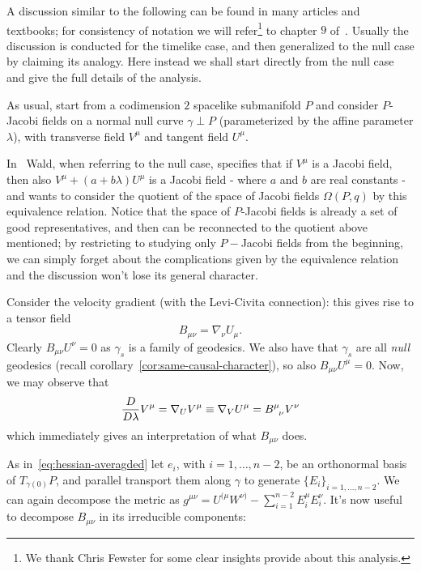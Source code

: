 A discussion similar to the following can be found in many articles and textbooks; for consistency of notation we will refer\footnote{We thank Chris Fewster for some clear insights provide about this analysis.} to chapter \(9\) of~\cite{wald2010general}.
Usually the discussion is conducted for the timelike case, and then generalized to the null case by claiming its analogy. Here instead we shall start directly from the null case and give the full details of the analysis.
	
As usual, start from a codimension \(2\) spacelike submanifold \(P\) and consider \(P\)-Jacobi fields on a normal null curve \(\gamma \perp P\) (parameterized by the affine parameter \(\lambda\)), with transverse field \(V^{\mu}\) and tangent field \(U^{\mu}\).
\begin{remark}
	In~\cite{wald2010general} Wald, when referring to the null case, specifies that if \(V^{\mu}\) is a Jacobi field, then also \(V^{\mu} + (a + b\lambda) U^{\mu}\) is a Jacobi field - where \(a\) and \(b\) are real constants - and wants to consider the quotient of the space of Jacobi fields \(\Omega (P,q)\) by this equivalence relation. Notice that the space of \(P\)-Jacobi fields is already a set of good representatives, and then can be reconnected to the quotient above mentioned; by restricting to studying only \(P-\)Jacobi fields from the beginning, we can simply forget about the complications given by the equivalence relation and the discussion won't lose its general character.
\end{remark}

Consider the velocity gradient (with the Levi-Civita connection): this gives rise to a tensor field
\[
B_{\mu\nu} = \nabla_{\nu}U_{\mu}.
\]
Clearly \(B_{\mu\nu}U^{\nu} = 0\) as \(\gamma_s\) is a family of geodesics. We also have that \(\gamma_s\) are all \emph{null} geodesics (recall corollary~\ref{cor:same-causal-character}), so also \(B_{\mu\nu}U^{\mu} = 0\). Now, we may observe that
\[
\frac{D}{D\lambda} V^{\mu} = \nabla_U V^{\mu} \equiv \nabla_V U^{\mu} = B\indices{^{\mu}_{\nu}} V^{\nu}
\]
which immediately gives an interpretation of what \(B_{\mu\nu}\) does.
	
As in~\ref{eq:hessian-averagded} let \(e_i\), with \(i = 1, \ldots, n - 2\), be an orthonormal basis of \(T_{\gamma(0)}P\), and parallel transport them along \(\gamma\) to generate \(\{E_i\}_{i = 1, \ldots, n-2}\). We can again decompose the metric as \(g^{\mu\nu} = U^{(\mu}W^{\nu)} - \sum_{i=1}^{n - 2}E_i^{\mu}E_i^{\nu}\). It's now useful to decompose \(B_{\mu\nu}\) in its irreducible components:
	
